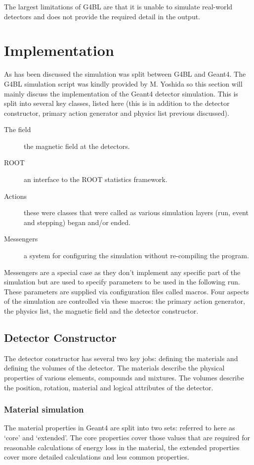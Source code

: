 The largest limitations of G4BL are that it is unable to simulate real-world detectors and does not provide the required detail in the output. 

\chapter{Implementation} %
\label{cha:implementation}
As has been discussed the simulation was split between G4BL and Geant4. The G4BL simulation script was kindly provided by M. Yoshida so this section will mainly discuss the implementation of the Geant4 detector simulation. This is split into several key classes, listed here (this is in addition to the detector constructor, primary action generator and physics list previous discussed).
\begin{description}
  \item[The field] the magnetic field at the detectors.
  \item[ROOT] an interface to the ROOT statistics framework.
  \item[Actions] these were classes that were called as various simulation layers (run, event and stepping) began and/or ended.
  \item[Messengers] a system for configuring the simulation without re-compiling the program.
\end{description}
Messengers are a special case as they don't implement any specific part of the simulation but are used to specify parameters to be used in the following run. These parameters are supplied via configuration files called macros. Four aspects of the simulation are controlled via these macros: the primary action generator, the physics list, the magnetic field and the detector constructor. 

\section{Detector Constructor} %
\label{sec:detector_constructor}
The detector constructor has several two key jobs: defining the materials and defining the volumes of the detector. The materials describe the physical properties of various elements, compounds and mixtures. The volumes describe the position, rotation, material and logical attributes of the detector. 

\subsection{Material simulation} %
\label{sub:material_simulation}
The material properties in Geant4 are split into two sets: referred to here as `core' and `extended'. The core properties cover those values that are required for reasonable calculations of energy loss in the material, the extended properties cover more detailed calculations and less common properties. 

